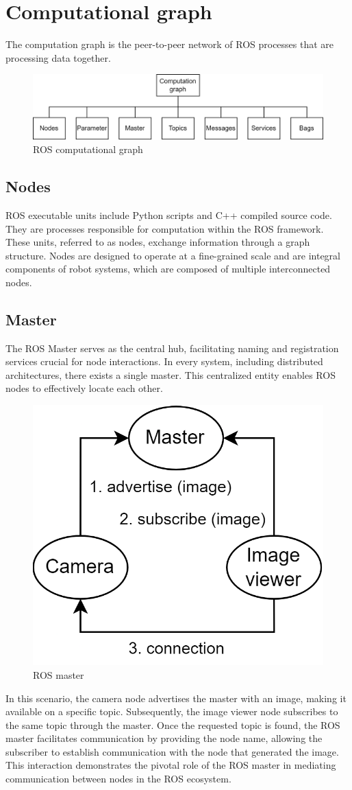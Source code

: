 \section{Computational graph}

The computation graph is the peer-to-peer network of ROS processes that are processing data together.
\begin{figure}[H]
    \centering
    \includegraphics[width=0.75\linewidth]{images/cg.png}
    \caption{ROS computational graph}
\end{figure}

\subsection{Nodes}
ROS executable units include Python scripts and C++ compiled source code. 
They are processes responsible for computation within the ROS framework. 
These units, referred to as nodes, exchange information through a graph structure. 
Nodes are designed to operate at a fine-grained scale and are integral components of robot systems, which are composed of multiple interconnected nodes.

\subsection{Master}
The ROS Master serves as the central hub, facilitating naming and registration services crucial for node interactions. 
In every system, including distributed architectures, there exists a single master.
This centralized entity enables ROS nodes to effectively locate each other.
\begin{figure}[H]
    \centering
    \includegraphics[width=0.5\linewidth]{images/master.png}
    \caption{ROS master}
\end{figure}
In this scenario, the camera node advertises the master with an image, making it available on a specific topic. 
Subsequently, the image viewer node subscribes to the same topic through the master.
Once the requested topic is found, the ROS master facilitates communication by providing the node name, allowing the subscriber to establish communication with the node that generated the image. 
This interaction demonstrates the pivotal role of the ROS master in mediating communication between nodes in the ROS ecosystem.

